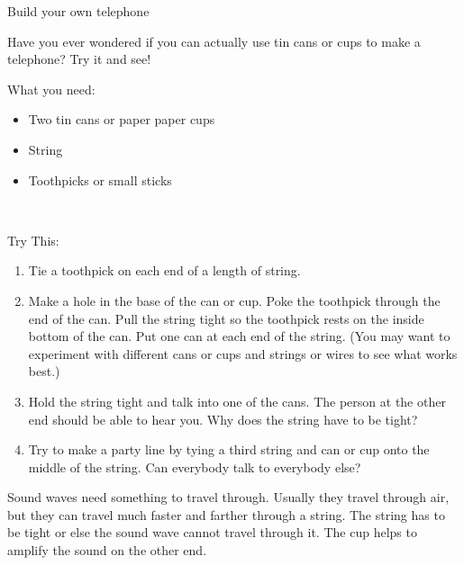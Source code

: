 	
\begin{activity}{Build your own telephone} 
\begin{minipage}{.85\textwidth}
Have you ever wondered if you can actually use tin cans or cups to make a telephone? Try it and see!

What you need:
\begin{itemize}
 \item Two tin cans or paper paper cups
  \item String
  \item Toothpicks or small sticks
\end{itemize}
\end{minipage}\\
\begin{minipage}{.85\textwidth}
Try This:
\begin{enumerate}[noitemsep, label=\textbf{\arabic*}. ] 
\item Tie a toothpick on each end of a length of string.
\item Make a hole in the base of the can or cup. Poke the toothpick through the end of the can. Pull the string tight so the toothpick rests on the inside bottom of the can. Put one can at each end of the string. (You may want to experiment with different cans or cups and strings or wires to see what works best.)
\item Hold the string tight and talk into one of the cans. The person at the other end should be able to hear you. Why does the string have to be tight?
\item Try to make a party line by tying a third string and can or cup onto the middle of the string. Can everybody talk to everybody else?
\end{enumerate}

Sound waves need something to travel through. Usually they travel through air, but they can travel much faster and farther through a string. The string has to be tight or else the sound wave cannot travel through it. The cup helps to amplify the sound on the other end. 
\end{minipage}
\end{activity}

